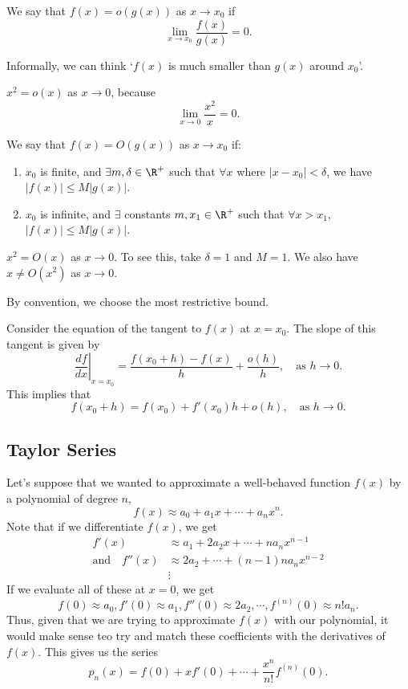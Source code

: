 \documentclass[a4]{scrartcl}
\begin{document}
\begin{definition}[Little-$o$]
	We say that $f(x) = o(g(x))$ as $x \rightarrow x_0$ if
	$$
\lim_{x \to x_0} \frac{f(x)}{g(x)} = 0.
	$$
\end{definition}

Informally, we can think `$f(x)$ is much smaller than $g(x)$ around $x_0$'.

\begin{example}
	$x^2 = o(x)$ as $x \rightarrow 0$, because
	$$
	\lim_{x \to 0} \frac{x^2}{x} = 0.
	$$
\end{example}

\begin{definition}[Big-$O$]
	We say that $f(x) = O(g(x))$ as $x \rightarrow x_0$ if:
	\begin{enumerate}[label=(\roman*)]
		\item $x_0$ is finite, and $\exists m , \delta \in \R^{+}$ such that $\forall x$ where $|x - x_0| < \delta$, we have $|f(x)| \leq M | g(x)|$.
		\item $x_0$ is infinite, and $\exists$ constants $m, x_1 \in \R^{+}$ such that $\forall x > x_1$, $|f(x)| \leq M |g(x)|$.
	\end{enumerate}
\end{definition}

\begin{example}
	$x^2 = O(x)$ as $x \rightarrow 0$. To see this, take $\delta = 1$ and $M = 1$. We also have $x \neq O(x^2)$ as $x \rightarrow 0$.
\end{example}

By convention, we choose the most restrictive bound.

Consider the equation of the tangent to $f(x)$ at $x = x_0$. The slope of this tangent is given by
$$
\left.\frac{d f}{d x}\right|_{x=x_0} = \frac{f(x_0 + h) - f(x)}{h} + \frac{o(h)}{h}, \quad \text{as } h \rightarrow 0. 
$$
This implies that
$$
f(x_0 + h) = f(x_0) + f'(x_0) h + o(h), \quad \text{as } h \rightarrow 0.
$$

\subsection{Taylor Series}

Let's suppose that we wanted to approximate a well-behaved function $f(x)$ by a polynomial of degree $n$,
$$
f(x) \approx a_0 + a_1 x + \cdots + a_n x^n.
$$
Note that if we differentiate $f(x)$, we get
\begin{align*}
	f'(x) &\approx a_1 + 2a_2 x + \cdots + n a_n x^{n - 1} \\
	\text{and} \quad f''(x) &\approx 2a_2 + \cdots + (n- 1)n a_n x^{n - 2} \\
	&\vdots
\end{align*}
If we evaluate all of these at $x = 0$, we get
$$
f(0) \approx a_0, f'(0) \approx a_1, f''(0) \approx 2a_2, \cdots, f^{(n)}(0) \approx n! a_n.
$$
Thus, given that we are trying to approximate $f(x)$ with our polynomial, it would make sense teo try and match these coefficients with the derivatives of $f(x)$. This gives us the series
$$
p_n(x) = f(0) + x f'(0) + \cdots + \frac{x^n}{n!} f^{(n)}(0).
$$
\end{document}
